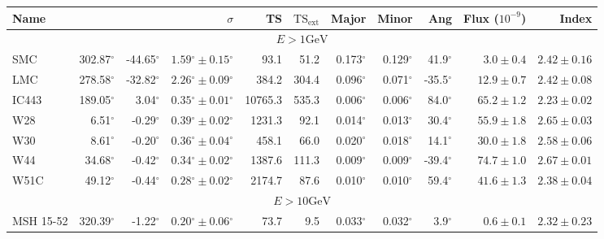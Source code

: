 \documentclass[12pt,preprint]{aastex}
\newcommand{\gev}{\text{GeV}\xspace}
\newcommand{\tsext}{{\ensuremath{\text{TS}_\text{ext}}}\xspace}
\newcommand{\glon}{\text{GLON}\xspace}
\newcommand{\glat}{\text{GLAT}\xspace}
\renewcommand{\deg}{\ensuremath{^\circ}\xspace}
\begin{document}
\clearpage
\begin{table}
    \begin{centering}
      \begin{tabular}{l|rrrrrrrrrr}
        \hline
        \hline
        Name                 &          \glon &          \glat &                    $\sigma$ &         TS &   $\tsext$ &      Major &      Minor &        Ang &      Flux ($10^{-9}$) &                 Index \\
        \hline
        \multicolumn{11}{c}{$E > 1 \gev$} \\
        \hline
        SMC                  &     302.87\deg &     -44.65\deg & $  1.59\deg \pm   0.15\deg$ &       93.1 &       51.2 &  0.173\deg &  0.129\deg &   41.9\deg & $    3.0 \pm     0.4$ & $   2.42 \pm    0.16$ \\
        LMC                  &     278.58\deg &     -32.82\deg & $  2.26\deg \pm   0.09\deg$ &      384.2 &      304.4 &  0.096\deg &  0.071\deg &  -35.5\deg & $   12.9 \pm     0.7$ & $   2.42 \pm    0.08$ \\
        IC443                &     189.05\deg &       3.04\deg & $  0.35\deg \pm   0.01\deg$ &    10765.3 &      535.3 &  0.006\deg &  0.006\deg &   84.0\deg & $   65.2 \pm     1.2$ & $   2.23 \pm    0.02$ \\
        W28                  &       6.51\deg &      -0.29\deg & $  0.39\deg \pm   0.02\deg$ &     1231.3 &       92.1 &  0.014\deg &  0.013\deg &   30.4\deg & $   55.9 \pm     1.8$ & $   2.65 \pm    0.03$ \\
        W30                  &       8.61\deg &      -0.20\deg & $  0.36\deg \pm   0.04\deg$ &      458.1 &       66.0 &  0.020\deg &  0.018\deg &   14.1\deg & $   30.0 \pm     1.8$ & $   2.58 \pm    0.06$ \\
        W44                  &      34.68\deg &      -0.42\deg & $  0.34\deg \pm   0.02\deg$ &     1387.6 &      111.3 &  0.009\deg &  0.009\deg &  -39.4\deg & $   74.7 \pm     1.0$ & $   2.67 \pm    0.01$ \\
        W51C                 &      49.12\deg &      -0.44\deg & $  0.28\deg \pm   0.02\deg$ &     2174.7 &       87.6 &  0.010\deg &  0.010\deg &   59.4\deg & $   41.6 \pm     1.3$ & $   2.38 \pm    0.04$ \\
        \hline
        \multicolumn{11}{c}{$E > 10 \gev$} \\
        \hline
        MSH 15-52            &     320.39\deg &      -1.22\deg & $  0.20\deg \pm   0.06\deg$ &       73.7 &        9.5 &  0.033\deg &  0.032\deg &    3.9\deg & $    0.6 \pm     0.1$ & $   2.32 \pm    0.23$ \\

\end{tabular}
\end{centering}
\end{table}
\end{document}
